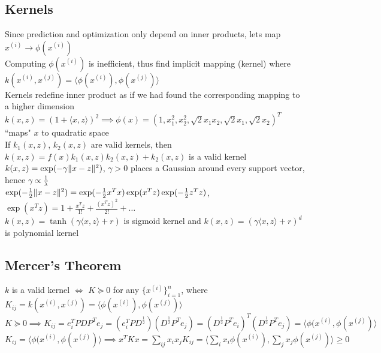 \documentclass{article}
\newcommand\inner[2]{\langle #1, #2 \rangle}
\DeclarePairedDelimiter\norm{\lVert}{\rVert}
\begin{document}
\subsection{Kernels}
Since prediction and optimization only depend on inner products, lets map $x^{(i)} \to \phi(x^{(i)})$ \\
Computing $\phi(x^{(i)})$ is inefficient, thus find implicit mapping (kernel) where $k(x^{(i)}, x^{(j)}) = \inner{\phi(x^{(i)})}{\phi(x^{(j)})}$ \\
Kernels redefine inner product as if we had found the corresponding mapping to a higher dimension \\
$k(x,z) = (1 + \inner{x}{z})^2 \implies \phi(x) = (1, x_1^2, x_2^2, \sqrt{2}x_1x_2, \sqrt{2}x_1, \sqrt{2}x_2)^T$ ``maps" $x$ to quadratic space \\
If $k_1(x, z)$, $k_2(x, z)$ are valid kernels, then $k(x, z) = f(x)k_1(x, z)k_2(x, z) + k_2(x, z)$ is a valid kernel \\
$k(x, z) = \exp(-\gamma \norm{x-z}^2)$, $\gamma > 0$ places a Gaussian around every support vector, hence $\gamma \propto \frac{1}{\lambda}$ \\
$\exp(-\frac{1}{2}\norm{x-z}^2) = \exp(-\frac{1}{2}x^Tx)\exp(x^Tz)\exp(-\frac{1}{2}z^Tz)$, $\exp(x^Tz) = 1 + \frac{x^Tz}{1!} + \frac{(x^Tz)^2}{2!} + \ldots$ \\
$k(x,z) = \tanh(\gamma\inner{x}{z} + r)$ is sigmoid kernel and $k(x, z) = (\gamma\inner{x}{z} + r)^d$ is polynomial kernel

\subsection{Mercer's Theorem}
$k$ is a valid kernel $\iff$ $K \succeq 0$ for any $\{x^{(i)}\}_{i=1}^n$, where $K_{ij} = k(x^{(i)}, x^{(j)})  = \inner{\phi(x^{(i)})}{\phi(x^{(j)})}$ \\
$K \succeq 0 \implies K_{ij} = e_i^TPDP^Te_j = (e_i^TPD^{\frac{1}{2}})(D^{\frac{1}{2}}P^Te_j) = (D^\frac{1}{2}P^Te_i)^T(D^\frac{1}{2}P^Te_j) = \inner{\phi(x^{(i)}}{\phi(x^{(j)})}$ \\
$K_{ij} = \inner{\phi(x^{(i)}}{\phi(x^{(j)})} \implies x^TKx = \sum_{ij} x_ix_j K_{ij} = \inner{\sum_i x_i \phi(x^{(i)})}{\sum_j x_j \phi(x^{(j)})} \geq 0 $

\newpage
\end{document}

